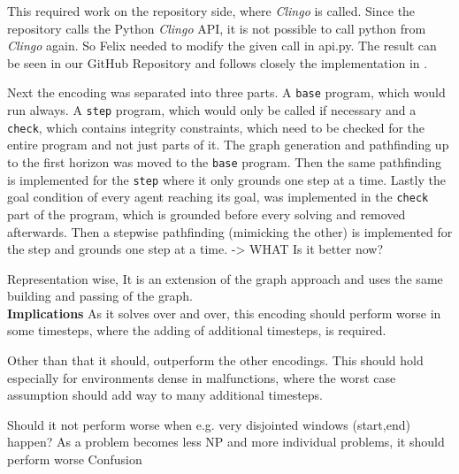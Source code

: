 This required work on the repository side, where \textit{Clingo} is called. Since the repository calls the Python \textit{Clingo} API, it is not possible to call python from \textit{Clingo} again. So Felix needed to modify the given call in api.py. The result can be seen in our GitHub Repository and follows closely the implementation in \cite{incr}.

Next the encoding was separated into three parts. A \texttt{base} program, which would run always. A \texttt{step} program, which would only be called if necessary and a \texttt{check}, which contains integrity constraints, which need to be checked for the entire program and not just parts of it. The graph generation and pathfinding up to the first horizon was moved to the \texttt{base} program. Then the same pathfinding is implemented for the \texttt{step} where it only grounds one step at a time. Lastly the goal condition of every agent reaching its goal, was implemented in the \texttt{check} part of the program, which is grounded before every solving and removed afterwards.
\color{red} Then a stepwise pathfinding (mimicking the other) is implemented for the step and grounds one step at a time. -> WHAT \color{black} \color{green} Is it better now? \color{black}

Representation wise, It is an extension of the graph approach and uses the same building and passing of the graph.\\

\noindent \textbf{Implications} As it solves over and over, this encoding should perform worse in some timesteps, where the adding of additional timesteps, is required.

Other than that it should, outperform the other encodings. This should hold especially for environments dense in malfunctions, where the worst case assumption should add way to many additional timesteps.

\color{red} Should it not perform worse when e.g.  very disjointed windows (start,end) happen? As a problem becomes less NP and more individual problems, it should perform worse \color{black} \color{green} Confusion \color{black}
